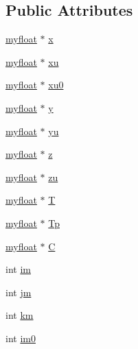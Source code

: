 \subsection*{Public Attributes}
\begin{DoxyCompactItemize}
\item 
\hyperlink{param_8h_a5f097c9f3873af7be7fc156e6a06ca5e}{myfloat} $\ast$ \hyperlink{classVar__CPU_a72fe5cb174134b2dbd91fa5e7aa8cd48}{x}
\item 
\hyperlink{param_8h_a5f097c9f3873af7be7fc156e6a06ca5e}{myfloat} $\ast$ \hyperlink{classVar__CPU_a57299c58d3054420e4f96f5b086c1c35}{xu}
\item 
\hyperlink{param_8h_a5f097c9f3873af7be7fc156e6a06ca5e}{myfloat} $\ast$ \hyperlink{classVar__CPU_a95c188a5f797471ee586f7dd00cb078c}{xu0}
\item 
\hyperlink{param_8h_a5f097c9f3873af7be7fc156e6a06ca5e}{myfloat} $\ast$ \hyperlink{classVar__CPU_a96ee8bdeed5a084d0fa9091994bd946e}{y}
\item 
\hyperlink{param_8h_a5f097c9f3873af7be7fc156e6a06ca5e}{myfloat} $\ast$ \hyperlink{classVar__CPU_a6366483e84b52bb4bf1115c355242b9b}{yu}
\item 
\hyperlink{param_8h_a5f097c9f3873af7be7fc156e6a06ca5e}{myfloat} $\ast$ \hyperlink{classVar__CPU_a0bf380785a4e55378dbae25cd0122857}{z}
\item 
\hyperlink{param_8h_a5f097c9f3873af7be7fc156e6a06ca5e}{myfloat} $\ast$ \hyperlink{classVar__CPU_abbec398f5de4be1a5b3f6a9a0ffba982}{zu}
\item 
\hyperlink{param_8h_a5f097c9f3873af7be7fc156e6a06ca5e}{myfloat} $\ast$ \hyperlink{classVar__CPU_a739ca02f9614572f55afe13cc8735679}{T}
\item 
\hyperlink{param_8h_a5f097c9f3873af7be7fc156e6a06ca5e}{myfloat} $\ast$ \hyperlink{classVar__CPU_a729580b61cce08c2c9429ee4ad4e5793}{Tp}
\item 
\hyperlink{param_8h_a5f097c9f3873af7be7fc156e6a06ca5e}{myfloat} $\ast$ \hyperlink{classVar__CPU_a9f9dcf8862d19503f7ed275246cb4b84}{C}
\item 
int \hyperlink{classVar__CPU_a5c3a4805c272c3f25a90cbec36332cbe}{im}
\item 
int \hyperlink{classVar__CPU_a6a513de26ea14960f51c9147617b4e22}{jm}
\item 
int \hyperlink{classVar__CPU_afd7b09f93c697a7d1e9ab46903be3e38}{km}
\item 
int \hyperlink{classVar__CPU_ad2936f4d25519a47bb79fdfd4da19926}{im0}
\end{DoxyCompactItemize}



